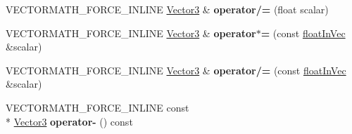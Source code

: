 \begin{DoxyCompactItemize}
\item 
\hypertarget{class_vectormath_1_1_aos_1_1_vector3_a3a36769bd188e8c1065a390a1c1a8118}{V\+E\+C\+T\+O\+R\+M\+A\+T\+H\+\_\+\+F\+O\+R\+C\+E\+\_\+\+I\+N\+L\+I\+N\+E \hyperlink{class_vectormath_1_1_aos_1_1_vector3}{Vector3} \& {\bfseries operator/=} (float scalar)}\label{class_vectormath_1_1_aos_1_1_vector3_a3a36769bd188e8c1065a390a1c1a8118}

\item 
\hypertarget{class_vectormath_1_1_aos_1_1_vector3_a042a0f245af81c9418f29fc0117b43b0}{V\+E\+C\+T\+O\+R\+M\+A\+T\+H\+\_\+\+F\+O\+R\+C\+E\+\_\+\+I\+N\+L\+I\+N\+E \hyperlink{class_vectormath_1_1_aos_1_1_vector3}{Vector3} \& {\bfseries operator$\ast$=} (const \hyperlink{class_vectormath_1_1float_in_vec}{float\+In\+Vec} \&scalar)}\label{class_vectormath_1_1_aos_1_1_vector3_a042a0f245af81c9418f29fc0117b43b0}

\item 
\hypertarget{class_vectormath_1_1_aos_1_1_vector3_aaab5ddcc72b35d13f5e8f93c2345548b}{V\+E\+C\+T\+O\+R\+M\+A\+T\+H\+\_\+\+F\+O\+R\+C\+E\+\_\+\+I\+N\+L\+I\+N\+E \hyperlink{class_vectormath_1_1_aos_1_1_vector3}{Vector3} \& {\bfseries operator/=} (const \hyperlink{class_vectormath_1_1float_in_vec}{float\+In\+Vec} \&scalar)}\label{class_vectormath_1_1_aos_1_1_vector3_aaab5ddcc72b35d13f5e8f93c2345548b}

\item 
\hypertarget{class_vectormath_1_1_aos_1_1_vector3_a13f0c65fd5ea5cd61f4783cd803bc627}{V\+E\+C\+T\+O\+R\+M\+A\+T\+H\+\_\+\+F\+O\+R\+C\+E\+\_\+\+I\+N\+L\+I\+N\+E const \\*
\hyperlink{class_vectormath_1_1_aos_1_1_vector3}{Vector3} {\bfseries operator-\/} () const }\label{class_vectormath_1_1_aos_1_1_vector3_a13f0c65fd5ea5cd61f4783cd803bc627}

\end{DoxyCompactItemize}
